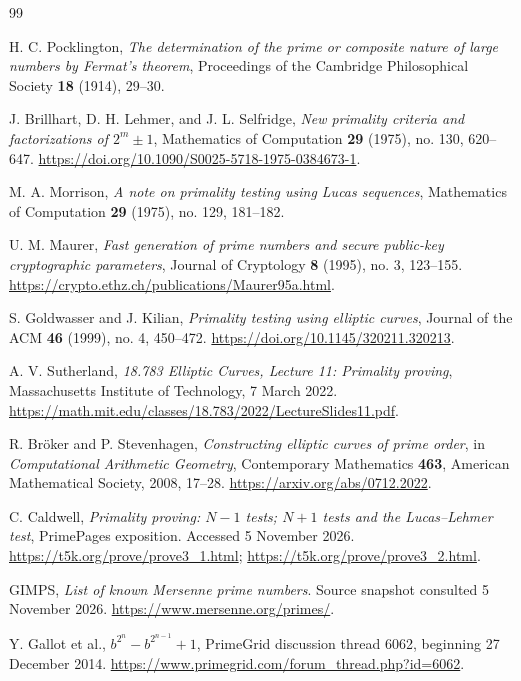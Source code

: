\documentclass[11pt,a4paper]{article}
\theoremstyle{definition}\newtheorem{definition}[theorem]{Definition}
\theoremstyle{remark}\newtheorem{remark}[theorem]{Remark}
\begin{document}
\clearpage
\begin{thebibliography}{99}
\small\raggedright\setlength{\itemsep}{3pt}\setlength{\parskip}{0pt}

H. C. Pocklington, \emph{The determination of the prime or composite nature
of large numbers by Fermat's theorem}, Proceedings of the Cambridge
Philosophical Society \textbf{18} (1914), 29--30.

J. Brillhart, D. H. Lehmer, and J. L. Selfridge,
\emph{New primality criteria and factorizations of $2^m\pm1$}, Mathematics
of Computation \textbf{29} (1975), no. 130, 620--647.
\url{https://doi.org/10.1090/S0025-5718-1975-0384673-1}.

M. A. Morrison, \emph{A note on primality testing using Lucas sequences},
Mathematics of Computation \textbf{29} (1975), no. 129, 181--182.

U. M. Maurer, \emph{Fast generation of prime numbers and secure public-key
cryptographic parameters}, Journal of Cryptology \textbf{8} (1995), no. 3,
123--155. \url{https://crypto.ethz.ch/publications/Maurer95a.html}.

S. Goldwasser and J. Kilian, \emph{Primality testing using elliptic curves},
Journal of the ACM \textbf{46} (1999), no. 4, 450--472.
\url{https://doi.org/10.1145/320211.320213}.

A. V. Sutherland, \emph{18.783 Elliptic Curves, Lecture 11: Primality
proving}, Massachusetts Institute of Technology, 7 March 2022.
\url{https://math.mit.edu/classes/18.783/2022/LectureSlides11.pdf}.

R. Br\"oker and P. Stevenhagen, \emph{Constructing elliptic curves of prime
order}, in \emph{Computational Arithmetic Geometry}, Contemporary
Mathematics \textbf{463}, American Mathematical Society, 2008, 17--28.
\url{https://arxiv.org/abs/0712.2022}.

C. Caldwell, \emph{Primality proving: $N-1$ tests; $N+1$ tests and the
Lucas--Lehmer test}, PrimePages exposition. Accessed 5 November 2026.
\url{https://t5k.org/prove/prove3_1.html};
\url{https://t5k.org/prove/prove3_2.html}.

GIMPS, \emph{List of known Mersenne prime numbers}. Source snapshot consulted
5 November 2026. \url{https://www.mersenne.org/primes/}.

Y. Gallot et al., \emph{$b^{2^n}-b^{2^{n-1}}+1$}, PrimeGrid discussion
thread 6062, beginning 27 December 2014.
\url{https://www.primegrid.com/forum_thread.php?id=6062}.


\end{thebibliography}
\end{document}
